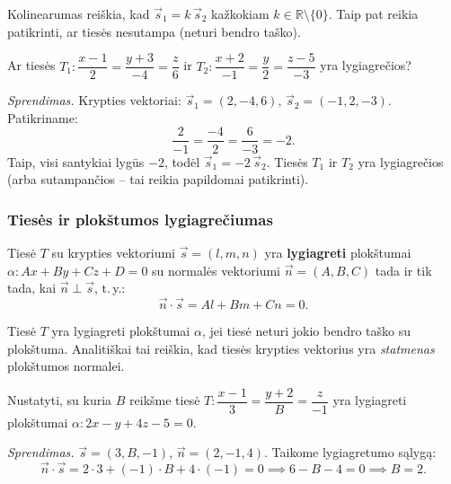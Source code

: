 \begin{remark}
Kolinearumas reiškia, kad $\vec{s}_1 = k\,\vec{s}_2$ kažkokiam $k \in \mathbb{R}
\setminus \{0\}$. Taip pat reikia patikrinti, ar tiesės nesutampa (neturi
bendro taško).
\end{remark}

\begin{example}
Ar tiesės $T_1\colon \dfrac{x-1}{2} = \dfrac{y+3}{-4} = \dfrac{z}{6}$ ir
$T_2\colon \dfrac{x+2}{-1} = \dfrac{y}{2} = \dfrac{z-5}{-3}$ yra lygiagrečios?

\textit{Sprendimas.} Krypties vektoriai: $\vec{s}_1 = (2, -4, 6)$,
$\vec{s}_2 = (-1, 2, -3)$.
Patikriname:
\[
  \frac{2}{-1} = \frac{-4}{2} = \frac{6}{-3} = -2.
\]
Taip, visi santykiai lygūs $-2$, todėl $\vec{s}_1 = -2\,\vec{s}_2$.
Tiesės $T_1$ ir $T_2$ yra lygiagrečios (arba sutampančios -- tai reikia
papildomai patikrinti).
\end{example}

\subsubsection*{Tiesės ir plokštumos lygiagrečiumas}

\begin{theorem}
Tiesė $T$ su krypties vektoriumi $\vec{s} = (l, m, n)$ yra \textbf{lygiagreti}
plokštumai $\alpha\colon Ax + By + Cz + D = 0$ su normalės vektoriumi
$\vec{n} = (A, B, C)$ tada ir tik tada, kai $\vec{n} \perp \vec{s}$, t.\,y.:
\[
  \vec{n} \cdot \vec{s} = Al + Bm + Cn = 0.
\]
\end{theorem}

\begin{tcolorbox}[colback=blue!5!white, colframe=blue!40!black,
  title=Geometrinė prasmė]
Tiesė $T$ yra lygiagreti plokštumai $\alpha$, jei tiesė neturi jokio
bendro taško su plokštuma. Analitiškai tai reiškia, kad tiesės krypties
vektorius yra \emph{statmenas} plokštumos normalei.
\end{tcolorbox}

\begin{example}
Nustatyti, su kuria $B$ reikšme tiesė
$T\colon \dfrac{x-1}{3} = \dfrac{y+2}{B} = \dfrac{z}{-1}$
yra lygiagreti plokštumai $\alpha\colon 2x - y + 4z - 5 = 0$.

\textit{Sprendimas.} $\vec{s} = (3, B, -1)$, $\vec{n} = (2, -1, 4)$.
Taikome lygiagretumo sąlygą:
\[
  \vec{n} \cdot \vec{s} = 2 \cdot 3 + (-1) \cdot B + 4 \cdot (-1) = 0
  \implies 6 - B - 4 = 0 \implies B = 2.
\]
\end{example}

